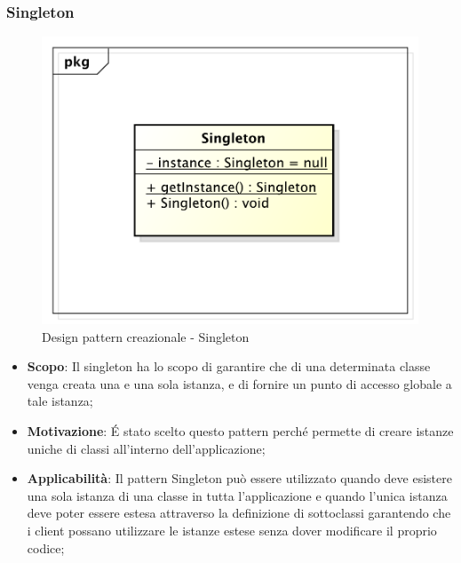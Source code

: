 		\newpage
		\subsubsection{Singleton} %

		\begin{figure}[htbp]
			\centering
			\centerline{\includegraphics[scale=0.5]{./images/designpatternappendice/singleton.pdf}}
			\caption{Design pattern creazionale - Singleton}
		\end{figure}

		\begin{itemize}
			\item \textbf{Scopo}: Il singleton ha lo scopo di garantire che di una determinata classe venga creata una e una sola istanza, e di fornire un punto di accesso globale a tale istanza;

			\item \textbf{Motivazione}: \'E stato scelto questo pattern perché permette di creare istanze uniche di classi all'interno dell'applicazione;

			\item \textbf{Applicabilità}: Il pattern Singleton può essere utilizzato quando deve esistere una sola istanza di una classe in tutta l'applicazione e quando l'unica istanza deve poter essere estesa attraverso la definizione di sottoclassi garantendo che i client possano utilizzare le istanze estese senza dover modificare il proprio codice;
		\end{itemize}




